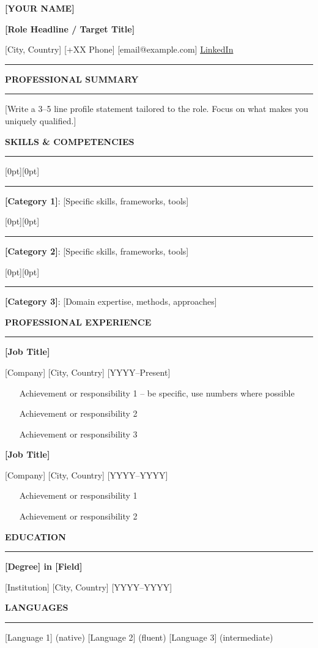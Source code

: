 \documentclass[10.5pt,a4paper]{article}
\newcommand{\cvsection}[1]{%
  \vspace{14pt}%
  {\color{cvNavy}\bfseries\fontsize{12}{14}\selectfont\MakeUppercase{#1}\par}%
  \vspace{4pt}%
  {\color{cvRule}\rule{\linewidth}{2pt}}%
  \vspace{8pt}%
}
\newcommand{\cvheader}[3]{%
  {\fontsize{28}{30}\bfseries\color{cvNavy}\MakeUppercase{#1}\par}
  \vspace{2pt}
  {\fontsize{14}{16}\bfseries\color{cvTitle}#2\par}
  \vspace{4pt}
  {\fontsize{9.5}{12}\color{cvMuted}#3\par}
  \vspace{6pt}
  {\color{cvNavy}\rule{\linewidth}{3pt}}
  \vspace{10pt}
}
\newcommand{\cvskillcategory}[2]{%
  \vspace{2pt}
  \noindent
  \raisebox{0pt}[0pt][0pt]{%
    \hspace{6pt}\textcolor{cvAccent}{\rule{3pt}{\baselineskip}}%
    \hspace{6pt}%
    \parbox[t]{0.97\linewidth}{\textbf{\color{cvNavy}#1}: #2}%
  }
  \par
}
\newcommand{\cvjob}[3]{%
  \needspace{5\baselineskip}
  {\fontsize{11}{13}\bfseries\color{cvText}#1\par}
  \vspace{1pt}
  {\fontsize{9.5}{12}\color{cvMuted}#2\par}
  \vspace{4pt}
  #3
  \vspace{8pt}
}
\newcommand{\cveducation}[2]{%
  #1\par
  \vspace{2pt}
  {\fontsize{9.5}{12}\color{cvMuted}#2\par}
  \vspace{6pt}
}
\begin{document}
\cvheader{[YOUR NAME]}{[Role Headline / Target Title]}{[City, Country] \textbar{} [+XX Phone] \textbar{} [email@example.com] \textbar{} \href{https://linkedin.com/in/your-profile}{LinkedIn}}

\cvsection{Professional Summary}
[Write a 3--5 line profile statement tailored to the role. Focus on what makes you uniquely qualified.]

\cvsection{Skills \& Competencies}
\cvskillcategory{[Category 1]}{[Specific skills, frameworks, tools]}
\cvskillcategory{[Category 2]}{[Specific skills, frameworks, tools]}
\cvskillcategory{[Category 3]}{[Domain expertise, methods, approaches]}

\cvsection{Professional Experience}
\cvjob{[Job Title]}{[Company] \textbar{} [City, Country] \textbar{} [YYYY--Present]}{%
\begin{itemize}
  \item [Achievement or responsibility 1 -- be specific, use numbers where possible]
  \item [Achievement or responsibility 2]
  \item [Achievement or responsibility 3]
\end{itemize}}

\cvjob{[Job Title]}{[Company] \textbar{} [City, Country] \textbar{} [YYYY--YYYY]}{%
\begin{itemize}
  \item [Achievement or responsibility 1]
  \item [Achievement or responsibility 2]
\end{itemize}}

\cvsection{Education}
\cveducation{\textbf{[Degree] in [Field]}}{[Institution] \textbar{} [City, Country] \textbar{} [YYYY--YYYY]}

\cvsection{Languages}
[Language 1] (native) \textbar{} [Language 2] (fluent) \textbar{} [Language 3] (intermediate)
\end{document}
